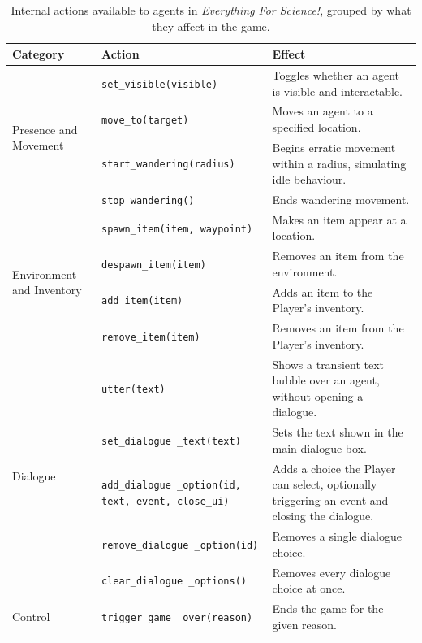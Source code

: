 \begin{table}[htpb]
\centering
\small
\begin{tabular}{|p{3cm}|p{3.2cm}|p{6.3cm}|}
\hline
\textbf{Category} & \textbf{Action} & \textbf{Effect} \\
\hline
\multirow{4}{3cm}{Presence and Movement} & \lstinline|set_visible(visible)| & Toggles whether an agent is visible and interactable. \\
\cline{2-3}
 & \lstinline|move_to(target)| & Moves an agent to a specified location. \\
\cline{2-3}
 & \lstinline|start_wandering(radius)| & Begins erratic movement within a radius, simulating idle behaviour. \\
\cline{2-3}
 & \lstinline|stop_wandering()| & Ends wandering movement. \\
\hline
\multirow{4}{3cm}{Environment and Inventory} & \lstinline|spawn_item(item, waypoint)| & Makes an item appear at a location. \\
\cline{2-3}
 & \lstinline|despawn_item(item)| & Removes an item from the environment. \\
\cline{2-3}
 & \lstinline|add_item(item)| & Adds an item to the Player's inventory. \\
\cline{2-3}
 & \lstinline|remove_item(item)| & Removes an item from the Player's inventory. \\
\hline
\multirow{5}{3cm}{Dialogue} & \lstinline|utter(text)| & Shows a transient text bubble over an agent, without opening a dialogue. \\
\cline{2-3}
 & \lstinline|set_dialogue _text(text)| & Sets the text shown in the main dialogue box. \\
\cline{2-3}
 & \lstinline|add_dialogue _option(id, text, event, close_ui)| & Adds a choice the Player can select, optionally triggering an event and closing the dialogue. \\
\cline{2-3}
 & \lstinline|remove_dialogue _option(id)| & Removes a single dialogue choice. \\
\cline{2-3}
 & \lstinline|clear_dialogue _options()| & Removes every dialogue choice at once. \\
\hline
Control & \lstinline|trigger_game _over(reason)| & Ends the game for the given reason. \\
\hline
\end{tabular}
\caption{Internal actions available to agents in \emph{Everything For Science!}, grouped by what they affect in the game.}
\label{tab:test-actions}
\end{table}


